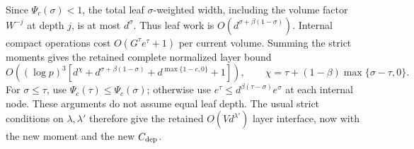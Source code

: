 Since $\Psi_c(\sigma)<1$, the total leaf $\sigma$-weighted width,
including the volume factor $W^{-j}$ at depth $j$, is at most
$d^\sigma$. Thus leaf work is
$O(d^{\sigma+\beta(1-\sigma)})$. Internal compact operations cost
$O(G^\tau e^\tau+1)$ per current volume. Summing the strict moments
gives the retained complete normalized layer bound
\[
 O\!\left((\log p)^3\left[
 d^\chi+d^{\sigma+\beta(1-\sigma)}+d^{\max\{1-c,0\}}+1
 \right]\right),\qquad
 \chi=\tau+(1-\beta)\max\{\sigma-\tau,0\}.
\]
For $\sigma\le\tau$, use $\Psi_c(\tau)\le\Psi_c(\sigma)$;
otherwise use $e^\tau\le d^{\beta(\tau-\sigma)}e^\sigma$ at each
internal node. These arguments do not assume equal leaf depth.
The usual strict conditions on $\lambda,\lambda'$ therefore give
the retained $O(Vd^{\lambda'})$ layer interface, now with the new
moment and the new $C_{\rm dep}$.
